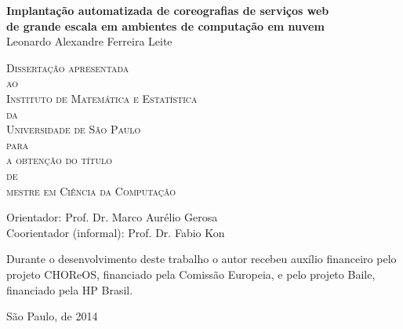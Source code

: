 \documentclass[11pt,twoside,a4paper]{book}
\newcommand\todo[1]{\nb{ToDo}{#1}}
\begin{document}
\frontmatter 
\fancyhead[RO]{{\footnotesize\rightmark}\hspace{2em}\thepage}
\setcounter{tocdepth}{2}
\fancyhead[LE]{\thepage\hspace{2em}\footnotesize{\leftmark}}
\fancyhead[RE,LO]{}
\fancyhead[RO]{{\footnotesize\rightmark}\hspace{2em}\thepage}

\onehalfspacing  %

\thispagestyle{empty}
\begin{center}
    \vspace*{2.3cm}
    \textbf{\Large{Implantação automatizada de coreografias de serviços web \\
    de grande escala em ambientes de computação em nuvem}}\\
    
    \vspace*{1.2cm}
    \Large{Leonardo Alexandre Ferreira Leite}
    
    \vskip 2cm
    \textsc{
    Dissertação apresentada\\[-0.25cm] 
    ao\\[-0.25cm]
    Instituto de Matemática e Estatística\\[-0.25cm]
    da\\[-0.25cm]
    Universidade de São Paulo\\[-0.25cm]
    para\\[-0.25cm]
    a obtenção do título\\[-0.25cm]
    de\\[-0.25cm]
    mestre em Ciência da Computação}
    
    \vskip 1.5cm
    Orientador: Prof. Dr. Marco Aurélio Gerosa\\
    Coorientador (informal): Prof. Dr. Fabio Kon

   	\vskip 1cm
    \normalsize{Durante o desenvolvimento deste trabalho o autor recebeu auxílio
    financeiro pelo projeto CHOReOS, financiado pela Comissão Europeia, e pelo projeto Baile, financiado pela HP Brasil.}
    
    \vskip 0.5cm
    \normalsize{São Paulo, \todo{MÊS} de 2014}
\end{center}
\end{document}
